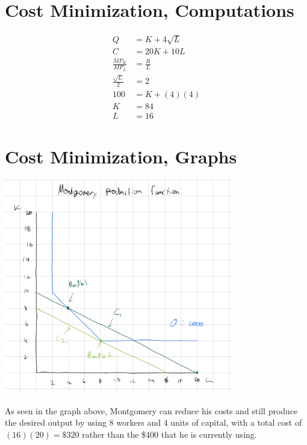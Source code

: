 \documentclass[8pt]{extarticle}
\begin{document}
{\section{Cost Minimization, Computations}
\begin{align*}
	Q &= K + 4\sqrt{L} \\
	C &= 20K + 10L \\
	\frac{MP_K}{MP_L} &= \frac{R}{L} \\
	\frac{\sqrt{L}}{2} &= 2 \\
	100 &= K + (4)(4) \\
	K &= 84 \\
	L &= 16
\end{align*}
\section{Cost Minimization, Graphs}
\begin{center}
	\includegraphics[width=10cm]{HW6Q9}
\end{center}
As seen in the graph above, Montgomery can reduce his costs and still produce the desired output by using 8 workers and 4 units of capital, with a total cost of $(16)(20) = \$320$ rather than the \$400 that he is currently using.
\pagebreak
}
\end{document}

